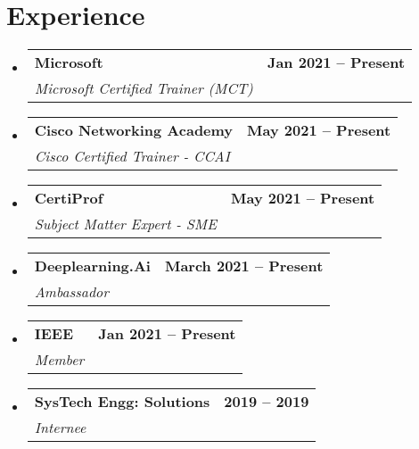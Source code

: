 \documentclass[letterpaper,11pt]{article}
\makeatletter
\newcommand{\resumeItem}[1]{
  \item\small{
    {#1 \vspace{-2pt}}
  }
}
\newcommand{\resumeSubheading}[4]{
  \vspace{-2pt}\item
    \begin{tabular*}{1.0\textwidth}[t]{l@{\extracolsep{\fill}}r}
      \textbf{#1} & \textbf{\small #2} \\
      \textit{\small#3} & \textit{\small #4} \\
    \end{tabular*}\vspace{-7pt}
}
\newcommand{\resumeSubHeadingListStart}{\begin{itemize}[leftmargin=0.0in, label={}]}
\newcommand{\resumeSubHeadingListEnd}{\end{itemize}}
\newcommand{\resumeItemListStart}{\begin{itemize}}
\newcommand{\resumeItemListEnd}{\end{itemize}\vspace{-5pt}}
\makeatother
\begin{document}
\section{Experience}
  \resumeSubHeadingListStart

    \resumeSubheading
      {Microsoft}{Jan 2021 -- Present}
      {Microsoft Certified Trainer (MCT)}{}

    \resumeSubheading
      {Cisco Networking Academy}{May 2021 -- Present}
      {Cisco Certified Trainer - CCAI}{}
      
    \resumeSubheading
      {CertiProf}{May 2021 -- Present}
      {Subject Matter Expert - SME}{}
      
    \resumeSubheading
      {Deeplearning.Ai}{March 2021 -- Present}
      {Ambassador}{}
      
     \resumeSubheading
      {IEEE}{Jan 2021 -- Present}
      {Member}{}
      
    \resumeSubheading
      {SysTech Engg: Solutions}{2019 -- 2019}
      {Internee}{}

    
  \resumeSubHeadingListEnd
\vspace{-16pt}

\end{document}
